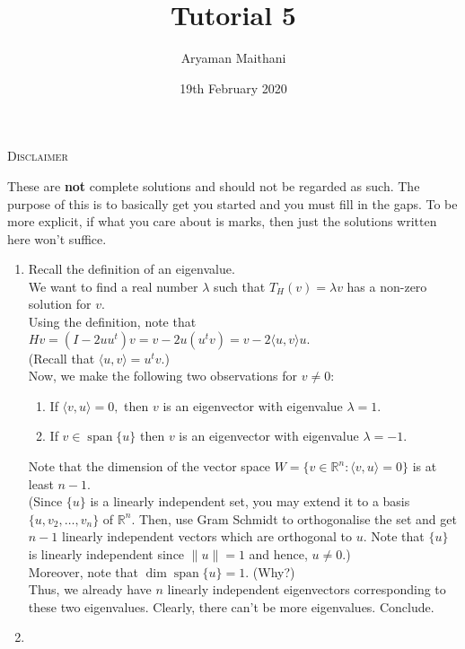 \documentclass{article}
\title{Tutorial 5}				%
\author{Aryaman Maithani}
\date{19th February 2020}		%
\begin{document}
\maketitle

\hrulefill

\begin{center}
	\textsc{Disclaimer}
\end{center}
These are \textbf{not} complete solutions and should not be regarded as such. The purpose of this is to basically get you started and you must fill in the gaps. To be more explicit, if what you care about is marks, then just the solutions written here won't suffice.

\hrulefill

\begin{enumerate} 
	\item Recall the definition of an eigenvalue.\\
	We want to find a real number $\lambda$ such that $T_H(v) = \lambda v$ has a non-zero solution for $v.$\\
	Using the definition, note that $Hv = (I - 2uu^t)v = v - 2u(u^tv) = v - 2\langle u, v\rangle u.$\\
	(Recall that $\langle u, v\rangle = u^tv.$)\\
	Now, we make the following two observations for $v \neq 0$:
	\begin{enumerate}[nosep] 
		\item If $\langle v, u\rangle = 0,$ then $v$ is an eigenvector with eigenvalue $\lambda = 1.$
		\item If $v \in \operatorname{span}\{u\}$ then $v$ is an eigenvector with eigenvalue $\lambda = -1.$
	\end{enumerate}
	Note that the dimension of the vector space $W = \{v \in \mathbb{R}^n : \langle v, u\rangle = 0\}$ is at least $n - 1.$\\
	(Since $\{u\}$ is a linearly independent set, you may extend it to a basis $\{u, v_2, \ldots, v_n\}$ of $\mathbb{R}^n.$ Then, use Gram Schmidt to orthogonalise the set and get $n-1$ linearly independent vectors which are orthogonal to $u.$ Note that $\{u\}$ is linearly independent since $\|u\| = 1$ and hence, $u \neq 0$.)\\
	Moreover, note that $\dim \operatorname{span}\{u\} = 1.$ \hfill (Why?)\\
	Thus, we already have $n$ linearly independent eigenvectors corresponding to these two eigenvalues. Clearly, there can't be more eigenvalues. Conclude.
	\item 

\end{enumerate}
\end{document}
